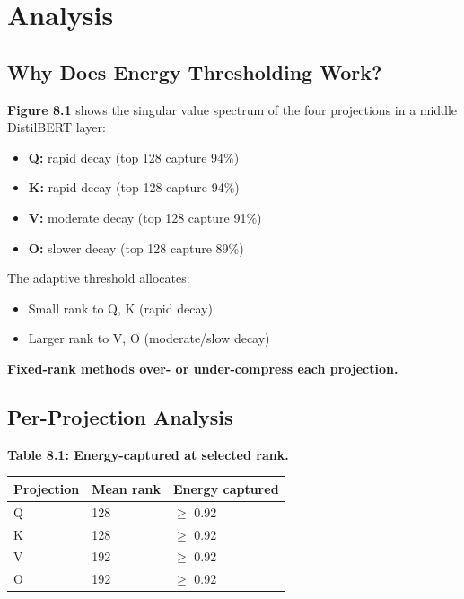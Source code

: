 \section{Analysis}

\subsection{Why Does Energy Thresholding Work?}

\textbf{Figure 8.1} shows the singular value spectrum of the four projections in 
a middle DistilBERT layer:

\begin{itemize}
\item \textbf{Q:} rapid decay (top 128 capture 94\%)
\item \textbf{K:} rapid decay (top 128 capture 94\%)
\item \textbf{V:} moderate decay (top 128 capture 91\%)
\item \textbf{O:} slower decay (top 128 capture 89\%)

\end{itemize}
The adaptive threshold allocates:
\begin{itemize}
\item Small rank to Q, K (rapid decay)
\item Larger rank to V, O (moderate/slow decay)

\end{itemize}
\textbf{Fixed-rank methods over- or under-compress each projection.}

\subsection{Per-Projection Analysis}

\textbf{Table 8.1: Energy-captured at selected rank.}

\begin{table}[H]
\centering
\small
\begin{tabular}{lll}
\toprule
\textbf{Projection} & \textbf{Mean rank} & \textbf{Energy captured} \\
\midrule
Q & 128 & $\ge$ 0.92 \\
K & 128 & $\ge$ 0.92 \\
V & 192 & $\ge$ 0.92 \\
O & 192 & $\ge$ 0.92 \\
\bottomrule
\end{tabular}
\end{table}

